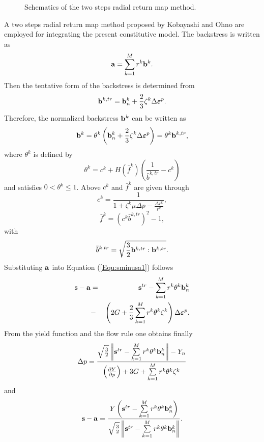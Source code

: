 \documentclass[preprint,5p,twocolumn,11pt,sort&compress]{elsarticle}
\newcommand{\bfepsilon}{{\mbox{\boldmath{$\varepsilon$}}}}
\newcommand{\bfa}{{\bf a}}
\newcommand{\bfb}{{\bf b}}
\newcommand{\bfs}{{\bf s}}
\begin{document}
\begin{figure}[!htp]
\caption{Schematics of the two steps radial return map method.}
\label{}
\end{figure}

A two steps radial return map method proposed by  Kobayashi and Ohno \cite{kobayashi2002implementation} are employed for integrating the present constitutive model. The backstress is written as
\begin{equation}
{\bfa} = \sum\limits_{k = 1}^M {r^k\bfb^k}.
\end{equation}
Then the tentative form of the backstress is determined from
\begin{equation}
\label{Equ:btrn+1}
\bfb^{k,tr} = \bfb_n^k + \frac{2}{3}{\zeta ^k}\Delta \bfepsilon^p.
\end{equation}
Therefore, the normalized backstress $\bfb^k$ can be written as
\begin{equation}
\label{Equ:bn+1}
\bfb^k = \theta ^k\left( {\bfb_n^k + \frac{2}{3}{\zeta ^k}\Delta \bfepsilon^p} \right) = \theta ^k\bfb^{k,tr},
\end{equation}
where $\theta ^k$ is defined by
\begin{equation}
\label{Equ:thetan+1}
\theta ^k = c^k + H\left( {\bar f^k} \right)\left( {\frac{1}{{\bar b^{k,tr}}} - c^k} \right)
\end{equation}
 and satisfies $0 < \theta ^k \leqslant 1$. Above $c^k$ and ${\bar f^k}$ are given through
\[
c^k = \frac{1}{{1 + {\zeta ^k}\mu \Delta {p} - \frac{{\Delta r^k}}{{r^k}}}},
\]
\[
\bar f^k = {\left( {c^k\bar b^{k,tr}} \right)^2} - 1,
\]
with
\[
\bar b^{k,tr} = \sqrt {\frac{3}{2}\bfb^{k,tr}:\bfb^{k,tr}}.
\]
Substituting ${\bfa}$ into Equation (\ref{Equ:sminusa1}) follows
\begin{eqnarray}
\label{Equ:sminusa2}
{{\bfs} - {\bfa}}&=&
\bfs^{tr} - \sum\limits_{k = 1}^M {r^k\theta ^k\bfb_n^k}
\\ \nonumber
&-& \left( {2G + \frac{2}{3}\sum\limits_{k = 1}^M {r^k\theta ^k{\zeta ^k}} } \right)\Delta \bfepsilon^p.
\end{eqnarray}
From the yield function and the flow rule one obtains finally
\begin{equation}
\Delta {p} = \frac{{\sqrt {\frac{3}{2}} \left\| {\bfs^{tr} - \sum\limits_{k = 1}^M {r^k\theta ^k\bfb_n^k} } \right\| - {Y_n}}}{{{{\left( {\frac{{\partial Y}}{{\partial p}}} \right)}} + 3G + \sum\limits_{k = 1}^M {r^k\theta ^k{\zeta ^k}} }}
\end{equation}
and
\begin{equation}
{\bfs} - {\bfa} = \frac{{{Y}\left( {\bfs^{tr} - \sum\limits_{k = 1}^M {r^k\theta ^k\bfb_n^k} } \right)}}{{\sqrt {\frac{3}{2}} \left\| {\bfs^{tr} - \sum\limits_{k = 1}^M {r^k\theta ^k\bfb_n^k} } \right\|}}.
\end{equation}
\end{document}
